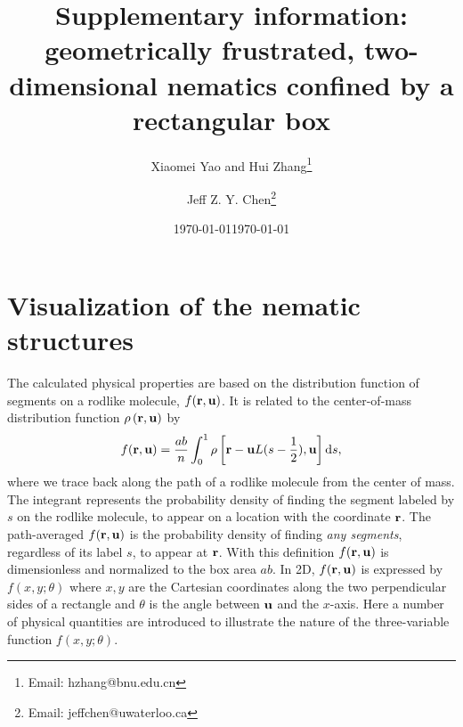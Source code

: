 \documentclass[pre,twocolumn,preprintnumbers,reprint]{revtex4}
\newcommand{\dd}{\mathrm{d}}
\newcommand{\bu}{{\bf u}}
\newcommand{\br}{{\bf r}}
\begin{document}

\title{Supplementary information: geometrically frustrated, two-dimensional nematics confined by a rectangular box
}

\author{Xiaomei Yao and Hui Zhang\footnote{Email: hzhang@bnu.edu.cn }}
\date{\today}

\author{Jeff Z. Y. Chen\footnote{Email: jeffchen@uwaterloo.ca}}
\date{\today}


\maketitle


\section*{Visualization of the nematic structures}

The calculated physical properties are based on the distribution function of segments on a rodlike molecule, $f(\br, \bu)$. It is related to the center-of-mass distribution function  $\rho \left (\br , \bu \right )$ by
\begin{equation}\label{fdef}
f(\br,\bu) = {ab\over n} \int_0^1 \rho \left [\br - \bu L(s-{1\over 2}), \bu \right ] \dd s,
\end{equation}
where we trace back along the path of a rodlike molecule from the center of mass. The integrant
represents the probability density of finding the segment labeled by $s$ on the rodlike molecule, to appear on a location with the coordinate $\br$. The path-averaged $f(\br,\bu)$ is the probability density of finding {\emph{any segments}}, regardless of its label $s$, to appear at $\br$.
With this definition $f(\br,\bu)$ is dimensionless and normalized to the box area $ab$.
In 2D, $f(\br, \bu)$ is expressed by $f(x,y; \theta)$ where $x,y$ are the Cartesian coordinates along the two perpendicular sides of a rectangle and $\theta$ is the angle between $\bu$ and the $x$-axis. Here a number of physical quantities are introduced to illustrate the nature of the three-variable function $f(x,y; \theta)$.
\end{document}
